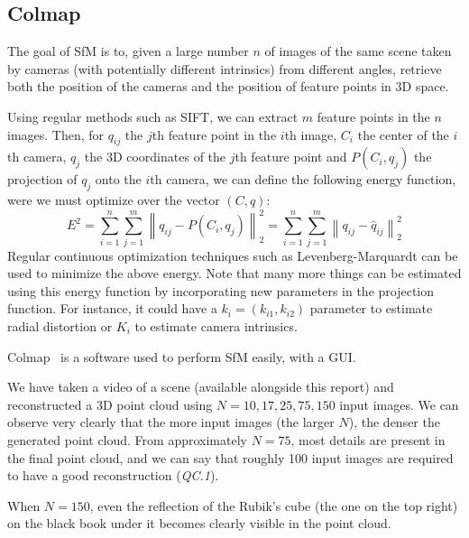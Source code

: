 \subsection{Colmap}\label{subsec:colmap}

The goal of SfM is to, given a large number $n$ of images of the same scene taken by cameras
(with potentially different intrinsics) from different angles, retrieve both the position of the cameras and the
position of feature points in 3D space.

Using regular methods such as SIFT, we can extract $m$ feature points in the $n$ images.
Then, for $q_{ij}$ the $j$th feature point in the $i$th image, $C_i$ the center of the $i$th camera, $q_j$ the
3D coordinates of the $j$th feature point and $P(C_i,q_j)$ the projection of $q_j$ onto the $i$th camera,
we can define the following energy function, were we must optimize over the vector $(C,q)$:
\[E^2=\sum_{i=1}^n\sum_{j=1}^m \left\|q_{ij}-P(C_i,q_j)\right\|_2^2=
\sum_{i=1}^n\sum_{j=1}^m \left\|q_{ij}-\hat{q}_{ij}\right\|_2^2\]
Regular continuous optimization techniques such as Levenberg-Marquardt can be used to minimize the above energy.
Note that many more things can be estimated using this energy function by incorporating new parameters in the
projection function.
For instance, it could have a $k_i=(k_{i1},k_{i2})$ parameter to estimate radial distortion or $K_i$ to estimate camera
intrinsics.

Colmap~\citep{colmap1, colmap2} is a software used to perform SfM easily, with a GUI\@.

We have taken a video of a scene (available alongside this report) and reconstructed a 3D point cloud using
$N=10,17,25,75,150$ input images.
We can observe very clearly that the more input images (the larger $N$), the denser the generated point cloud.
From approximately $N=75$, most details are present in the final point cloud, and we can say that roughly 100
input images are required to have a good reconstruction (\textit{QC.1}).

When $N=150$, even the reflection of the Rubik's cube (the one on the top right) on the black book under it becomes
clearly visible in the point cloud.

